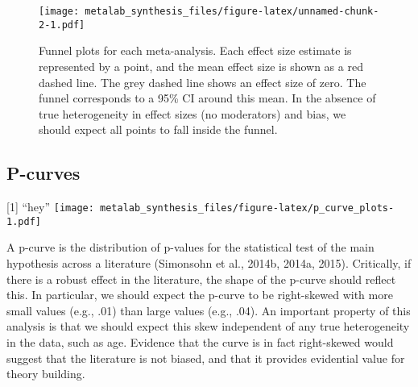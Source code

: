 \documentclass[english,floatsintext,man]{apa6}
\begin{document}
\begin{figure}[htbp]
\centering
\texttt{[image: metalab\_synthesis\_files/figure-latex/unnamed-chunk-2-1.pdf]}
\caption{Funnel plots for each meta-analysis. Each effect size estimate
is represented by a point, and the mean effect size is shown as a red
dashed line. The grey dashed line shows an effect size of zero. The
funnel corresponds to a 95\% CI around this mean. In the absence of true
heterogeneity in effect sizes (no moderators) and bias, we should expect
all points to fall inside the funnel.}
\end{figure}

\subsection{P-curves}\label{p-curves}

{[}1{]} \enquote{hey}
\texttt{[image: metalab\_synthesis\_files/figure-latex/p\_curve\_plots-1.pdf]}

A p-curve is the distribution of p-values for the statistical test of
the main hypothesis across a literature (Simonsohn et al., 2014b, 2014a,
2015). Critically, if there is a robust effect in the literature, the
shape of the p-curve should reflect this. In particular, we should
expect the p-curve to be right-skewed with more small values (e.g., .01)
than large values (e.g., .04). An important property of this analysis is
that we should expect this skew independent of any true heterogeneity in
the data, such as age. Evidence that the curve is in fact right-skewed
would suggest that the literature is not biased, and that it provides
evidential value for theory building.
\end{document}
